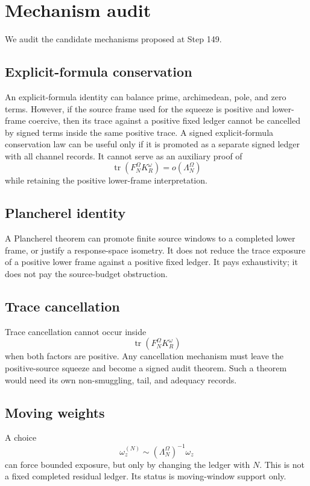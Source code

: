 \documentclass[11pt]{article}
\begin{document}
\section{Mechanism audit}
We audit the candidate mechanisms proposed at Step 149.

\subsection{Explicit-formula conservation}
An explicit-formula identity can balance prime, archimedean, pole, and zero terms.  However, if the source frame used for the squeeze is positive and lower-frame coercive, then its trace against a positive fixed ledger cannot be cancelled by signed terms inside the same positive trace.  A signed explicit-formula conservation law can be useful only if it is promoted as a separate signed ledger with all channel records.  It cannot serve as an auxiliary proof of
\[
  \operatorname{tr}(F_N^\Omega K_R^\omega)=o(\Lambda_N^\Omega)
\]
while retaining the positive lower-frame interpretation.

\subsection{Plancherel identity}
A Plancherel theorem can promote finite source windows to a completed lower frame, or justify a response-space isometry.  It does not reduce the trace exposure of a positive lower frame against a positive fixed ledger.  It pays exhaustivity; it does not pay the source-budget obstruction.

\subsection{Trace cancellation}
Trace cancellation cannot occur inside
\[
  \operatorname{tr}(F_N^\Omega K_R^\omega)
\]
when both factors are positive.  Any cancellation mechanism must leave the positive-source squeeze and become a signed audit theorem.  Such a theorem would need its own non-smuggling, tail, and adequacy records.

\subsection{Moving weights}
A choice
\[
  \omega_z^{(N)}\sim (\Lambda_N^\Omega)^{-1}\omega_z
\]
can force bounded exposure, but only by changing the ledger with \(N\).  This is not a fixed completed residual ledger.  Its status is moving-window support only.
\end{document}
